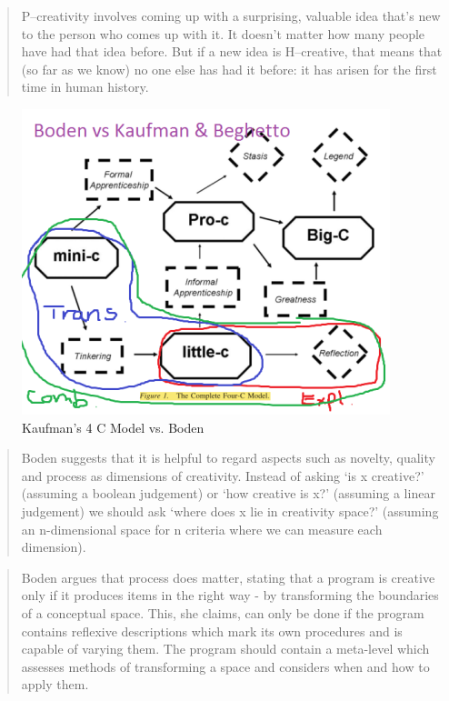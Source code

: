 \begin{quote}
	P–creativity involves coming up with a surprising, valuable idea that’s new to the person who comes up with it. It doesn’t matter how many people have had that idea before. But if a new idea is H–creative, that means that (so far as we know) no one else has had it before: it has arisen for the first time in human history. \citep{Boden2003}
\end{quote}

\begin{figure}[htb] %
  \centering
  \includegraphics[width=\linewidth]{images/4CBoden.png}
\caption[Kaufman vs Boden]{Kaufman's 4 C Model vs. Boden}
\label{fig:4CB}
\end{figure}

\begin{quote}
  Boden suggests that it is helpful to regard aspects such as novelty, quality and process as dimensions of creativity. Instead of asking ‘is x creative?’ (assuming a boolean judgement) or ‘how creative is x?’ (assuming a linear judgement) we should ask ‘where does x lie in creativity space?’ (assuming an n-dimensional space for n criteria where we can measure each dimension). \citep[p.8]{Pease2001}
\end{quote}

\begin{quote}
  Boden argues that process does matter, stating that a program is creative only if it produces items in the right way - by transforming the boundaries of a conceptual space. This, she claims, can only be done if the program contains reflexive descriptions which mark its own procedures and is capable of varying them. The program should contain a meta-level which assesses methods of transforming a space and considers when and how to apply them. \citep[p.8]{Pease2001}
\end{quote}

